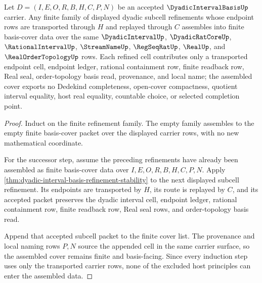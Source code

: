 \begin{theorem}
\label{thm:dyadic-interval-basis-refinement-cover}
Let $D=(I,E,O,R,B,H,C,P,N)$ be an accepted $\DyadicIntervalBasisUp$ carrier. Any finite family of displayed dyadic subcell refinements whose endpoint rows are transported through $H$ and replayed through $C$ assembles into finite basis-cover data over the same $\DyadicIntervalUp$, $\DyadicRatCoreUp$, $\RationalIntervalUp$, $\StreamNameUp$, $\RegSeqRatUp$, $\RealUp$, and $\RealOrderTopologyUp$ rows. Each refined cell contributes only a transported endpoint cell, endpoint ledger, rational containment row, finite readback row, Real seal, order-topology basis read, provenance, and local name; the assembled cover exports no Dedekind completeness, open-cover compactness, quotient interval equality, host real equality, countable choice, or selected completion point.
\end{theorem}
\begin{proof}
Induct on the finite refinement family. The empty family assembles to the empty finite basis-cover packet over the displayed carrier rows, with no new mathematical coordinate.

For the successor step, assume the preceding refinements have already been assembled as finite basis-cover data over $I,E,O,R,B,H,C,P,N$. Apply \autoref{thm:dyadic-interval-basis-refinement-stability} to the next displayed subcell refinement. Its endpoints are transported by $H$, its route is replayed by $C$, and its accepted packet preserves the dyadic interval cell, endpoint ledger, rational containment row, finite readback row, Real seal rows, and order-topology basis read.

Append that accepted subcell packet to the finite cover list. The provenance and local naming rows $P,N$ source the appended cell in the same carrier surface, so the assembled cover remains finite and basis-facing. Since every induction step uses only the transported carrier rows, none of the excluded host principles can enter the assembled data.
\end{proof}


